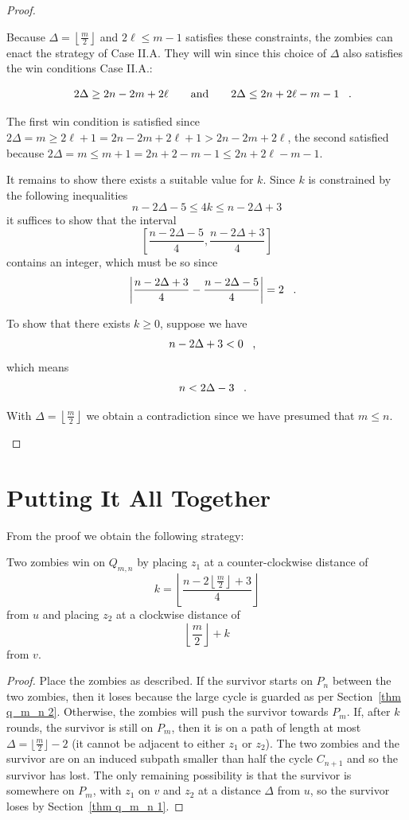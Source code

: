 \begin{proof}
\begin{proofpart}
Because $\Delta  = \left\lfloor \frac{m}{2} \right\rfloor$ and $2 \ell \leq m -1$ satisfies these constraints, the zombies can enact the strategy of Case II.A. They will win since this choice of $\Delta$ also satisfies the win conditions Case II.A.:

\[ 2 \Delta \geq 2n - 2m + 2\ell \qquad \text{and} \qquad 2 \Delta \leq 2n + 2\ell - m - 1 \mperiod \]

The first win condition is satisfied since $2\Delta = m \geq 2\ell +1 = 2n - 2m +2\ell +1 > 2n-2m+2\ell$, the second satisfied because $2 \Delta =m \leq m + 1 = 2n+2 -m -1 \leq 2n + 2\ell - m - 1$.

It remains to show there exists a suitable value for $k$. Since $k$ is constrained by the following inequalities
\[ n - 2\Delta -5 \leq 4k \leq n-2\Delta +3 \]
it suffices to show that the interval
\[ [ \frac{n-2\Delta -5}{4}, \frac{n-2\Delta+3}{4}] \]
contains an integer, which must be so since
\[ \left\lvert \frac{n-2\Delta+3}{4} - \frac{n-2\Delta -5}{4} \right\rvert = 2 \mperiod \]

To show that there exists $k \geq 0$, suppose we have
\[ n- 2\Delta +3 < 0 \mcomma \]
which means
\[ n < 2\Delta -3 \mperiod \]

With $\Delta = \left\lfloor \frac{m}{2} \right\rfloor$ we obtain a contradiction since we have presumed that $m \leq n$.

\end{proofpart}
\end{proof}

\section{Putting It All Together}\label{thm q_m_n 4}
From the proof we obtain the following strategy:
\begin{corollary}
  Two zombies win on $Q_{m,n}$ by placing $z_1$ at a counter-clockwise distance of
  \[ k = \left\lfloor \frac{n - 2 \left\lfloor\frac{m}{2}\right\rfloor +3}{4} \right\rfloor \]
  from $u$ and placing $z_2$ at a clockwise distance of
  \[ \left\lfloor \frac{m}{2} \right\rfloor + k \]
  from $v$.
\end{corollary}
\begin{proof}
  Place the zombies as described.
  If the survivor starts on $P_n$ between the two zombies, then it loses because the large cycle is guarded as per Section~\ref{thm q_m_n 2}.
  Otherwise, the zombies will push the survivor towards $P_m$.
  If, after $k$ rounds, the survivor is still on $P_m$, then it is on a path of length at most $\Delta = \lfloor \frac{m}{2} \rfloor - 2$ (it cannot be adjacent to either $z_1$ or $z_2$). The two zombies and the survivor are on an induced subpath smaller than half the cycle $C_{n+1}$ and so the survivor has lost.
  The only remaining possibility is that the survivor is somewhere on $P_m$, with $z_1$ on $v$ and $z_2$ at a distance $\Delta$ from $u$, so the survivor loses by Section~\ref{thm q_m_n 1}.
\end{proof}
